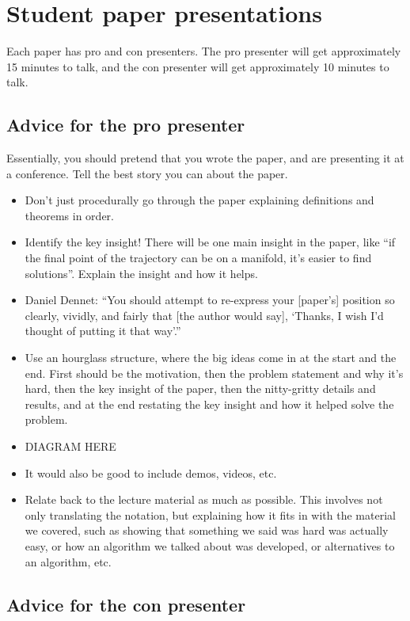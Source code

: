 \documentclass[twoside]{article}
\begin{document}
\section{Student paper presentations}
\label{sec:stud-paper-pres}

Each paper has pro and con presenters. The pro presenter will get approximately 15 minutes to talk, and the con presenter will get approximately 10 minutes to talk.

\subsection{Advice for the pro presenter}
\label{sec:advice-pro-presenter}

Essentially, you should pretend that you wrote the paper, and are presenting it at a conference. Tell the best story you can about the paper.

\begin{itemize}
\item Don't just procedurally go through the paper explaining definitions and theorems in order.
\item Identify the key insight! There will be one main insight in the paper, like ``if the final point of the trajectory can be on a manifold, it's easier to find solutions''. Explain the insight and how it helps.
\item Daniel Dennet: ``You should attempt to re-express your [paper's] position so clearly, vividly, and fairly that [the author would say], `Thanks, I wish I’d thought of putting it that way'.''
\item Use an hourglass structure, where the big ideas come in at the start and the end. First should be the motivation, then the problem statement and why it's hard, then the key insight of the paper, then the nitty-gritty details and results, and at the end restating the key insight and how it helped solve the problem.
\item DIAGRAM HERE
\item It would also be good to include demos, videos, etc.
\item Relate back to the lecture material as much as possible. This involves not only translating the notation, but explaining how it fits in with the material we covered, such as showing that something we said was hard was actually easy, or how an algorithm we talked about was developed, or alternatives to an algorithm, etc.
\end{itemize}

\subsection{Advice for the con presenter}
\label{sec:advice-con-presenter}
\end{document}
